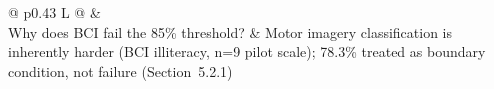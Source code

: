 
\iffalse %

\begin{table}[!htbp]
\caption{Anticipated Examiner Questions --- Chapter 5}
\tablefontsize\tablestripes
\begin{tabularx}{\textwidth}{@{} p{} L @{}}
\toprule
{} &  \\
\midrule
Why does BCI fail the 85\% threshold? & Motor imagery classification is inherently harder (BCI illiteracy, n=9 pilot scale); 78.3\% treated as boundary condition, not failure (Section~5.2.1) \\
\addlinespace
 \


\end{tabularx}
\end{table}
